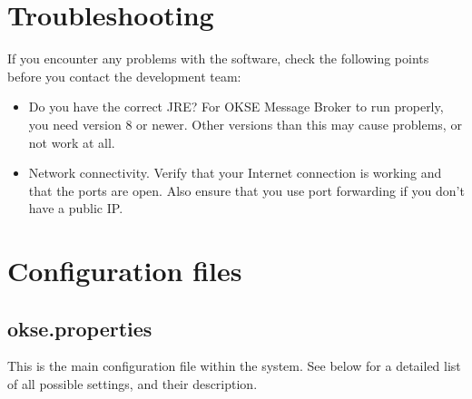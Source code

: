 \section{Troubleshooting}

If you encounter any problems with the software, check the following points before you contact the development team: 

\begin{itemize}
\setlength{\itemsep}{0cm}%
\item Do you have the correct JRE? For OKSE Message Broker to run properly, you need version 8 or newer. Other versions than this may cause problems, or not work at all.
\item Network connectivity. Verify that your Internet connection is working and that the ports are open. Also ensure that you use port forwarding if you don't have a public IP.
\end{itemize}

\section{Configuration files}
\label{sec:configuration-files}

\subsection{okse.properties}
\label{subsec:okse.properties}
 
 This is the main configuration file within the system. See below for a detailed list of all possible settings, and their description.

